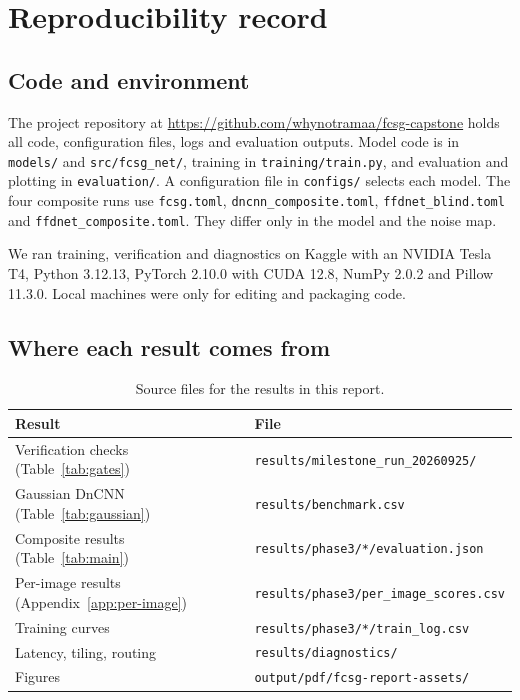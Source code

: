 \chapter{Reproducibility record}\label{app:repro}

\section{Code and environment}

The project repository at \url{https://github.com/whynotramaa/fcsg-capstone}
holds all code, configuration files, logs and evaluation outputs. Model code
is in \texttt{models/} and \texttt{src/fcsg\_net/}, training in
\texttt{training/train.py}, and evaluation and plotting in
\texttt{evaluation/}. A configuration file in \texttt{configs/} selects each
model. The four composite runs use \texttt{fcsg.toml},
\texttt{dncnn\_composite.toml}, \texttt{ffdnet\_blind.toml} and
\texttt{ffdnet\_composite.toml}. They differ only in the model and the noise
map.

We ran training, verification and diagnostics on Kaggle with an NVIDIA Tesla
T4, Python 3.12.13, PyTorch 2.10.0 with CUDA 12.8, NumPy 2.0.2 and Pillow
11.3.0. Local machines were only for editing and packaging code.

\section{Where each result comes from}

\begin{table}[htbp]
	\centering
	\caption{Source files for the results in this report.}
	\label{tab:sources}
	\small
	\begin{tabular}{@{}ll@{}}
		\toprule
		Result & File \\
		\midrule
		Verification checks (Table~\ref{tab:gates}) & \texttt{results/milestone\_run\_20260925/} \\
		Gaussian DnCNN (Table~\ref{tab:gaussian})   & \texttt{results/benchmark.csv} \\
		Composite results (Table~\ref{tab:main})     & \texttt{results/phase3/*/evaluation.json} \\
		Per-image results (Appendix~\ref{app:per-image}) & \texttt{results/phase3/per\_image\_scores.csv} \\
		Training curves                              & \texttt{results/phase3/*/train\_log.csv} \\
		Latency, tiling, routing                     & \texttt{results/diagnostics/} \\
		Figures                                      & \texttt{output/pdf/fcsg-report-assets/} \\
		\bottomrule
	\end{tabular}
\end{table}

